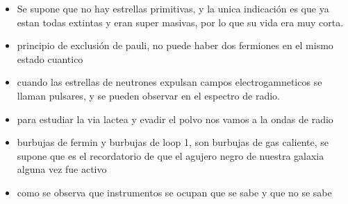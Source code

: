\documentclass[
  11pt,
  letterpaper,
  answers
]{exam}
\begin{document}
\begin{itemize}
    \item Se supone que no hay estrellas primitivas, y la unica indicación es que ya estan todas extintas y eran super masivas, por lo que su vida era muy corta.
    \item principio de exclusión de pauli, no puede haber dos fermiones en el mismo estado cuantico
    \item cuando las estrellas de neutrones expulsan campos electrogamneticos se llaman pulsares, y se pueden observar en el espectro de radio.
    \item para estudiar la via lactea y evadir el polvo nos vamos a la ondas de radio
    \item burbujas de fermin y burbujas de loop 1, son burbujas de gas caliente, se supone que es el recordatorio de que el agujero negro de nuestra galaxia alguna vez fue activo 
    \item como se observa que instrumentos se ocupan que se sabe y que no se sabe 
\end{itemize}
\end{document}
